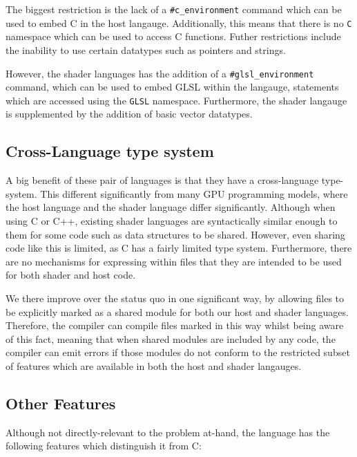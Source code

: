 \documentclass[a4paper,12pt,twoside,openright]{report}
\begin{document}
The biggest restriction is the lack of a \texttt{\#c\_environment} command
which can be used to embed C in the host langauge. Additionally, this means
that there is no \texttt{C} namespace which can be used to access C functions.
Futher restrictions include the inability to use certain datatypes such as
pointers and strings.

However, the shader languages has the addition of a
\texttt{\#glsl\_environment} command, which can be used to embed GLSL within
the langauge, statements which are accessed using the \texttt{GLSL} namespace.
Furthermore, the shader langauge is supplemented by the addition of basic
vector datatypes.



\subsection{Cross-Language type system}

A big benefit of these pair of languages is that they have a cross-language
type-system. This different significantly from many GPU programming models,
where the host language and the shader language differ significantly. Although
when using C or C++, existing shader languages are syntactically similar enough
to them for some code such as data structures to be shared. However, even
sharing code like this is limited, as C has a fairly limited type system.
Furthermore, there are no mechanisms for expressing within files that they are
intended to be used for both shader and host code.

We there improve over the status quo in one significant way, by allowing files
to be explicitly marked as a shared module for both our host and shader
languages. Therefore, the compiler can compile files marked in this way whilst
being aware of this fact, meaning that when shared modules are included by any
code, the compiler can emit errors if those modules do not conform to the
restricted subset of features which are available in both the host and shader
langauges.


\subsection{Other Features}

Although not directly-relevant to the problem at-hand, the language has the
following features which distinguish it from C:
\end{document}
